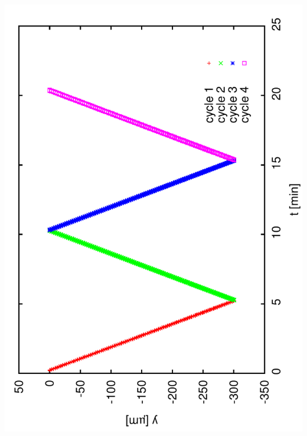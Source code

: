 \documentclass[a4paper,11pt]{book}
\begin{document}
\includegraphics[angle=-90,scale=0.15]{image01.pdf}
\end{document}
